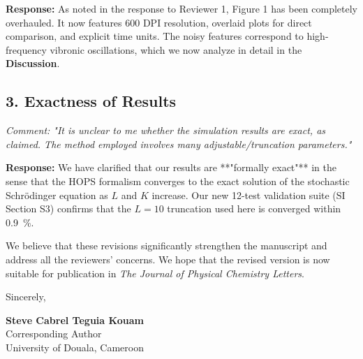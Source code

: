 \documentclass[11pt]{article}
\begin{document}
\textbf{Response:} As noted in the response to Reviewer 1, Figure 1 has been completely overhauled. It now features 600 DPI resolution, overlaid plots for direct comparison, and explicit time units. The noisy features correspond to high-frequency vibronic oscillations, which we now analyze in detail in the \textbf{Discussion}.

\subsection*{3. Exactness of Results}
\textit{Comment: "It is unclear to me whether the simulation results are exact, as claimed. The method employed involves many adjustable/truncation parameters."}

\textbf{Response:} We have clarified that our results are **"formally exact"** in the sense that the HOPS formalism converges to the exact solution of the stochastic Schrödinger equation as $L$ and $K$ increase. Our new 12-test validation suite (SI Section S3) confirms that the $L=10$ truncation used here is converged within \SI{0.9}{\percent}.

\vspace{3em}

\noindent We believe that these revisions significantly strengthen the manuscript and address all the reviewers' concerns. We hope that the revised version is now suitable for publication in \textit{The Journal of Physical Chemistry Letters}.

\vspace{1.5em}

\noindent Sincerely,

\vspace{2.5em}

\noindent \textbf{Steve Cabrel Teguia Kouam}\\
Corresponding Author\\
University of Douala, Cameroon
\end{document}
